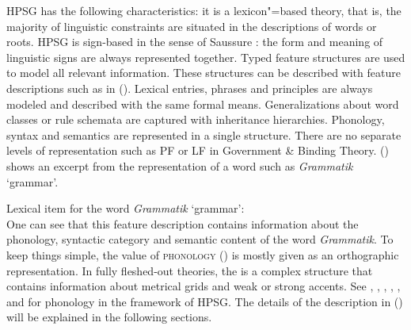HPSG has the following characteristics: it is a lexicon"=based theory, that is, the majority of
linguistic constraints are situated in the descriptions of words or roots. HPSG is sign-based in the
sense of Saussure \citeyearpar{Saussure16a-Fr}\nocite{Saussure16a}: the form and meaning of linguistic signs are always
represented together. Typed feature structures are used to model all relevant information. These
structures can be described with feature descriptions such as in (). Lexical entries, phrases
and principles are always modeled and described with the same formal means.  Generalizations about
word classes or rule schemata are captured with inheritance hierarchies. Phonology, syntax and
semantics are represented in a single structure. There are no separate levels of representation such
as PF or LF in Government \& Binding Theory.  () shows an excerpt from the representation of
a word such as \emph{Grammatik} `grammar'.

\ea
Lexical item for the word \emph{Grammatik} `grammar':\\
\z
One can see that this feature description contains information about the phonology, syntactic category and semantic content of the word
\emph{Grammatik}. To keep things simple, the value of \textsc{phonology} (\phon) is mostly given as
an orthographic representation. In fully fleshed-out
theories, the \phonv is a complex structure that contains information about metrical grids and weak or strong accents.
See , , , ,
, and  for phonology in the
framework of HPSG. The details of the description in () will be explained in the following sections.

